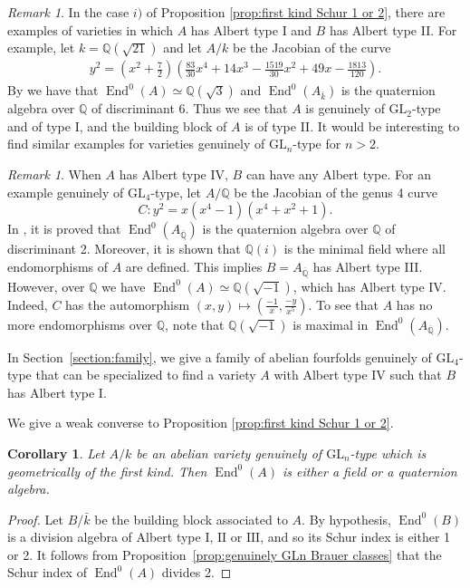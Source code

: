 \documentclass[oneside]{amsart}
\newtheorem{corollary}[theorem]{Corollary}
\theoremstyle{remark}
\newtheorem{remark}[theorem]{Remark}
\newcommand{\Q}{\mathbb Q}
\newcommand{\Qbar}{{\overline{\mathbb Q}}}
\newcommand{\kbar}{{\bar{k}}}
\newcommand{\GL}{\mathrm{GL}}
\newcommand{\End}{\operatorname{End}}
\newcommand{\I}{\mathrm{I}}
\newcommand{\II}{\mathrm{II}}
\newcommand{\III}{\mathrm{III}}
\numberwithin{equation}{section}
\newcommand{\QQ}{\mathbb{Q}}
\begin{document}
\begin{remark}
  In the case $i)$ of Proposition \ref{prop:first kind Schur 1 or 2}, there are examples of varieties in which $A$ has Albert type I and $B$ has Albert type II. For example, let $k=\Q(\sqrt{21})$ and let $A/k$ be the Jacobian of the curve
  \begin{align*}
    y^2 = \left(x^2 + \frac{7}{2}\right)\left(\frac{83}{30} x^4 + 14x^3 - \frac{1519}{30}x^2 + 49x - \frac{1813}{120}\right).
  \end{align*}
  By \cite{DR05} we have that $\End^0(A)\simeq \Q(\sqrt{3})$ and $\End^0(A_\kbar)$ is the quaternion algebra over $\Q$ of discriminant 6. Thus we see that $A$ is genuinely of $\GL_2$-type and of type I, and the building block of $A$ is of type II. It would be interesting to find similar examples for varieties genuinely of $\GL_n$-type for $n>2$.
\end{remark}

\begin{remark}
	When $A$ has Albert type IV, $B$ can have any Albert type. For an example genuinely of $\GL_4$-type, let $A/\QQ$ be the Jacobian of the genus 4 curve
	\[
		C: y^2 = x(x^4-1)(x^4+x^2+1).
	\]
	In \cite[Theorem~4.1.1]{CFLV23}, it is proved that $\End^0(A_{\Qbar})$ is the quaternion algebra over $\QQ$ of discriminant 2. Moreover, it is shown that $\QQ(i)$ is the minimal field where all endomorphisms of $A$ are defined.
	This implies $B=A_\Qbar$ has Albert type III. However, over $\QQ$ we have $\End^0(A)\simeq\QQ(\sqrt{-1})$, which has Albert type IV. Indeed, $C$ has the automorphism $(x,y)\mapsto \left(\frac{-1}{x},\frac{-y}{x^5}\right)$. To see that $A$ has no more endomorphisms over $\QQ$, note that $\QQ(\sqrt{-1})$ is maximal in $\End^0(A_{\Qbar})$.
\end{remark}

In Section~\ref{section:family}, we give a family of abelian fourfolds genuinely of $\GL_4$-type that can be specialized to find a variety $A$ with Albert type IV such that $B$ has Albert type I.

We give a weak converse to Proposition \ref{prop:first kind Schur 1 or 2}.

\begin{corollary}\label{corollary:schur index first kind}
Let $A/k$ be an abelian variety genuinely of $\GL_n$-type which is geometrically of the first kind. Then $\End^0(A)$ is either a field or a quaternion algebra.
\end{corollary}
\begin{proof}
Let $B/\bar k$ be the building block associated to $A$. By hypothesis, $\End^0(B)$ is a division algebra of Albert type $\I$, $\II$ or $\III$, and so its Schur index is either 1 or 2. It follows from Proposition~\ref{prop:genuinely GLn Brauer classes} that the Schur index of $\End^0(A)$ divides 2.
\end{proof}
\end{document}
